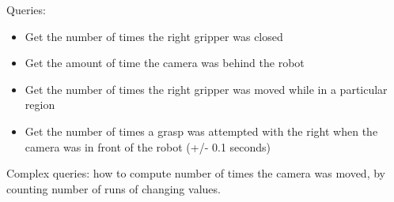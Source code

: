 \documentclass[nocopyrightspace]{acm_proc_article-sp}
\begin{document}
Queries:
\begin{itemize}
\item Get the number of times the right gripper was closed
\item Get the amount of time the camera was behind the robot
\item Get the number of times the right gripper was moved while in a particular region
\item Get the number of times a grasp was attempted with the right when the camera was in front of the robot (+/- 0.1 seconds)
\end{itemize}


Complex queries: how to compute number of times the camera was moved, by counting number of runs of changing values.




% 

%
%
%
%
%
%







  

\end{document}
